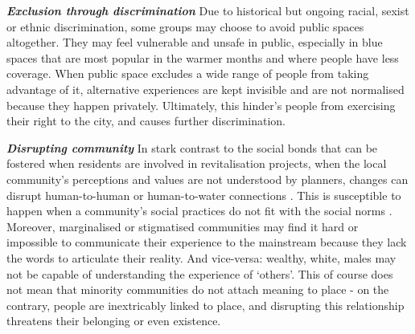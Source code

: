 \documentclass{article}
\newcommand{\bisection}[1]{\textbf{\textit{#1}}}
\begin{document}

\bisection{Exclusion through discrimination} Due to historical but ongoing racial, sexist or ethnic discrimination, some groups may choose to avoid public spaces altogether. They may feel vulnerable and unsafe in public, especially in blue spaces that are most popular in the warmer months and where people have less coverage.
When public space excludes a wide range of people from taking advantage of it, alternative experiences are kept invisible and are not normalised because they happen privately. Ultimately, this hinder's people from exercising their right to the city, and causes further discrimination.

\bisection{Disrupting community} 
In stark contrast to the social bonds that can be fostered when residents are involved in revitalisation projects, when the local community's perceptions and values are not understood by planners, changes can disrupt human-to-human or human-to-water connections \parencite{toomey2021place}. This is susceptible to happen when a community's social practices do not fit with the social norms \parencite{wessells2014urban}. 
Moreover, marginalised or stigmatised communities may find it hard or impossible to communicate their experience to the mainstream because they lack the words to articulate their reality. And vice-versa: wealthy, white, males may not be capable of understanding the experience of `others'.
This of course does not mean that minority communities do not attach meaning to place - on the contrary, people are inextricably linked to place, and disrupting this relationship threatens their belonging or even existence.

\end{document}
